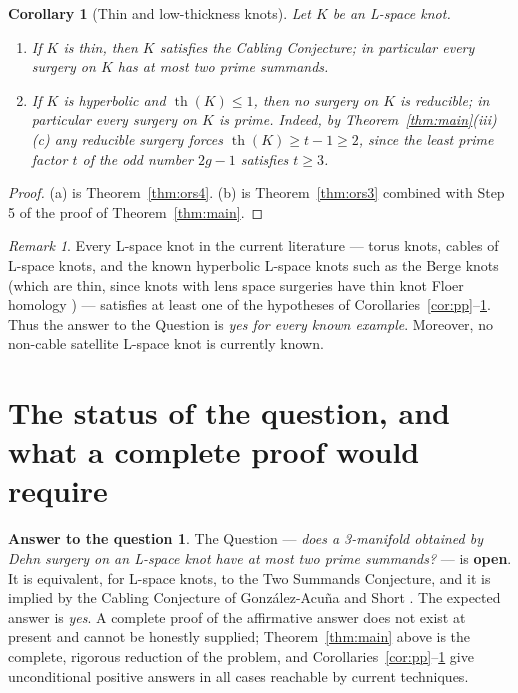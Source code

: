 \documentclass[11pt]{amsart}
\newtheorem{corollary}[theorem]{Corollary}
\theoremstyle{definition}
\newtheorem*{answer}{Answer to the question}
\theoremstyle{remark}
\newtheorem{remark}[theorem]{Remark}
\numberwithin{equation}{section}
\begin{document}
\begin{corollary}[Thin and low-thickness knots]\label{cor:thin}
Let $K$ be an L-space knot.
\begin{enumerate}
\item[(a)] If $K$ is thin, then $K$ satisfies the Cabling Conjecture; in
particular every surgery on $K$ has at most two prime summands.
\item[(b)] If $K$ is hyperbolic and
$\operatorname{th}(K)\le1$, then no surgery on $K$ is reducible; in
particular every surgery on $K$ is prime. Indeed, by
Theorem~\ref{thm:main}(iii)(c) any reducible surgery forces
$\operatorname{th}(K)\ge t-1\ge2$, since the least prime factor $t$ of
the odd number $2g-1$ satisfies $t\ge3$.
\end{enumerate}
\end{corollary}

\begin{proof}
(a) is Theorem~\ref{thm:ors4}. (b) is Theorem~\ref{thm:ors3} combined
with Step 5 of the proof of Theorem~\ref{thm:main}.
\end{proof}

\begin{remark}
Every L-space knot in the current literature --- torus knots, cables of
L-space knots, and the known hyperbolic L-space knots such as the Berge
knots (which are thin, since knots with lens space surgeries have thin
knot Floer homology \cite{OS3}) --- satisfies at least one of the
hypotheses of Corollaries~\ref{cor:pp}--\ref{cor:thin}. Thus the answer
to the Question is \emph{yes for every known example}. Moreover, no
non-cable satellite L-space knot is currently known.
\end{remark}

\section{The status of the question, and what a complete proof would
require}\label{sec:status}

\begin{answer}
The Question --- \emph{does a 3-manifold obtained by Dehn surgery on an
L-space knot have at most two prime summands?} --- is \textbf{open}. It
is equivalent, for L-space knots, to the Two Summands Conjecture, and it
is implied by the Cabling Conjecture of Gonz\'alez-Acu\~na and Short
\cite{GS}. The expected answer is \emph{yes}. A complete proof of the
affirmative answer does not exist at present and cannot be honestly
supplied; Theorem~\ref{thm:main} above is the complete, rigorous reduction
of the problem, and Corollaries~\ref{cor:pp}--\ref{cor:thin} give
unconditional positive answers in all cases reachable by current
techniques.
\end{answer}
\end{document}
